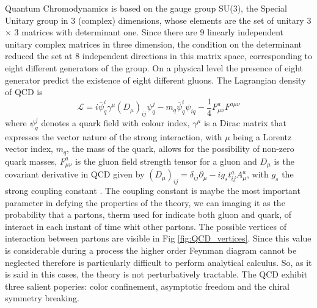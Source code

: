 \documentclass[12pt,a4paper]{book}
\begin{document}
	Quantum Chromodynamics is based on the gauge group SU(3), the Special Unitary group in 3 (complex) dimensions, whose elements are the set of unitary 3 × 3 matrices with determinant one. Since there are 9 linearly independent unitary complex matrices in three dimension, the condition on the determinant reduced the set at 8 independent directions in this matrix space, corresponding to eight different generators of the group. On a physical level the presence of eight generator predict the existence of eight different gluons.  The Lagrangian density of QCD is
	\begin{equation}
		\boxed{\mathcal{L}= i \bar{\psi}^i_q \gamma^\mu(D_\mu)_{ij}\psi^j_q- m_q \bar{\psi}^i_q \psi_{iq}-\frac{1}{4} F^a_{\mu \nu} F^{a\mu \nu}}
		\label{eq:QCD_lagrangian}
	\end{equation} 
	where $\psi^j_q$ denotes a quark field with colour index, $\gamma^\mu$ is a Dirac matrix that expresses the vector nature of the strong interaction, with $\mu$ being a Lorentz vector index, $m_q$, the mass of the quark, allows for the possibility of non-zero quark masses, $F^a_{\mu \nu}$ is the gluon field strength tensor for a gluon and $D_\mu$ is the covariant derivative in QCD given by $(D_\mu)_{ij}= \delta_{ij} \partial_\mu - ig_s t^a_{ij} A^a_\mu$, with $g_s$ the strong coupling constant \cite{Skands_2013}.
	The coupling constant is maybe the most important parameter in defying the properties of the theory, we can imaging it as the probability that a partons, therm used for indicate both gluon and quark, of interact in each instant of time whit other partons. The possible vertices of interaction between partons are visible in Fig \ref{fig:QCD_vertices}. Since this value is considerable during a process the higher order Feynman diagram cannot be neglected therefore is particularly difficult to perform analytical calculus. So, as it is said in this cases, the theory is not perturbatively tractable.  
	The QCD exhibit three salient poperies: color confinement, asymptotic freedom and the chiral symmetry breaking. 
	
\end{document}
